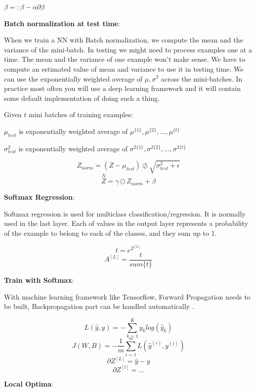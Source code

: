 \documentclass{article}
\begin{document}
\noindent \hspace{1cm} \(\beta =: \beta - \alpha \partial \beta\)

\bigskip

\noindent \textbf{Batch normalization at test time}:

\noindent When we train a NN with Batch normalization, we compute the mean and the variance of the mini-batch. In testing we might need to process examples one at a time. The mean and the variance of one example won't make sense. We have to compute an estimated value of mean and variance to use it in testing time. We can use the exponentially weighted average of \(\mu, \sigma^{2}\) across the mini-batches. In practice most often you will use a deep learning framework and it will contain some default implementation of doing such a thing.

\bigskip

\noindent Given \(t\) mini batches of training examples:

\noindent \(\mu_{test}\) is exponentially weighted average of \(\mu^{\{1\}}, \mu^{\{2\}}, \dots, \mu^{\{t\}}\)

\noindent \(\sigma^{2}_{test}\) is exponentially weighted average of \(\sigma^{2\{1\}}, \sigma^{2\{2\}}, \dots, \sigma^{2\{t\}}\)

\[Z_{norm} = (Z - \mu_{test}) \oslash \sqrt{\sigma^{2}_{test} + \epsilon}\]
\[\overset{N}{Z} = \gamma \odot Z_{norm} + \beta\]

\noindent \textbf{Softmax Regression}:

\noindent Softmax regression is used for multiclass classification/regression. It is normally used in the last layer. Each of values in the output layer represents a probability of the example to belong to each of the classes, and they sum up to 1.

\[t = e^{Z^{[L]}}\]
\[A^{[L]} = \frac{t}{sum\{t\}}\]

\noindent \textbf{Train with Softmax}:

\noindent With machine learning framework like Tensorflow, Forward Propagation needs to be built, Backpropagation part can be handled automatically .

\[L(\hat{y}, y) = - \sum^{K}_{k = 1} y_{k}log(\hat{y}_{k}) \]
\[J(W, B) = - \frac{1}{m} \sum_{i = 1}^{m} L(\hat{y}^{(i)}, y^{(i)})\]
\[\partial Z^{[L]} = \hat{y} - y\]
\[\partial Z^{[l]} = \dots\]

\noindent \textbf{Local Optima}:
\end{document}
